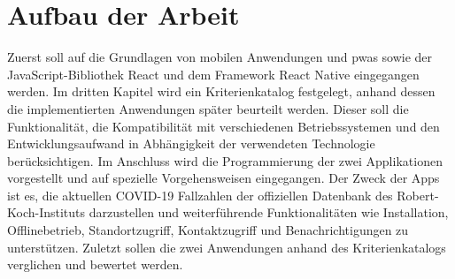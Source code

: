 \section{Aufbau der Arbeit}
Zuerst soll auf die Grundlagen von mobilen Anwendungen und \acp{pwa} sowie der JavaScript-Bibliothek React und dem Framework React Native eingegangen werden.
Im dritten Kapitel wird ein Kriterienkatalog festgelegt, anhand dessen die implementierten Anwendungen später beurteilt werden.
Dieser soll die Funktionalität, die Kompatibilität mit verschiedenen Betriebssystemen und den Entwicklungsaufwand in Abhängigkeit der verwendeten Technologie berücksichtigen.
Im Anschluss wird die Programmierung der zwei Applikationen vorgestellt und auf spezielle Vorgehensweisen eingegangen.
Der Zweck der Apps ist es, die aktuellen COVID-19 Fallzahlen der offiziellen Datenbank des Robert-Koch-Instituts darzustellen und weiterführende Funktionalitäten wie Installation, Offlinebetrieb, Standortzugriff, Kontaktzugriff und Benachrichtigungen zu unterstützen.
Zuletzt sollen die zwei Anwendungen anhand des Kriterienkatalogs verglichen und bewertet werden.
